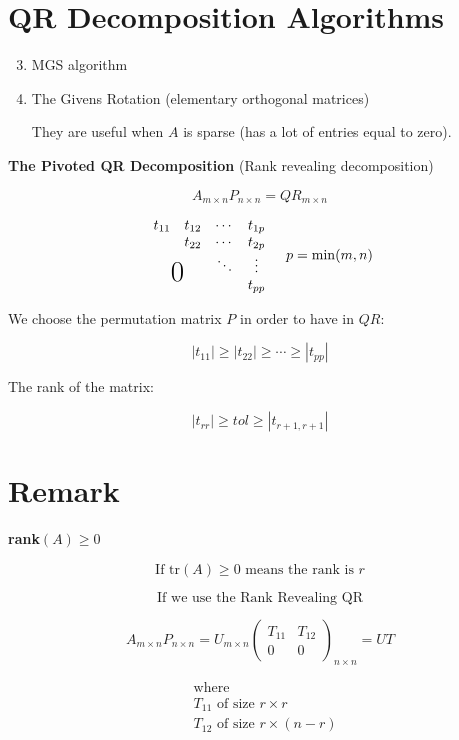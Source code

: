 \section*{QR Decomposition Algorithms}
\begin{enumerate}
    \setcounter{enumi}{2}
    \item MGS algorithm
    \item The Givens Rotation (elementary orthogonal matrices)
    
    They are useful when \( A \) is sparse (has a lot of entries equal to zero).
\end{enumerate}

\textbf{The Pivoted QR Decomposition} (Rank revealing decomposition)

\[
A_{m \times n} P_{n \times n} = QR_{m \times n}
\]

\[
\begin{array}{cccc}
t_{11} & t_{12} & \cdots & t_{1p} \\
 & t_{22} & \cdots & t_{2p} \\
 &  & \ddots & \vdots \\
\multicolumn{2}{c}{\raisebox{1.3ex}[0pt]{\huge0}} &  & t_{pp} \\
\end{array}
\quad p = \min(m, n)
\]

We choose the permutation matrix \( P \) in order to have in \( QR \):

\[
|t_{11}| \geq |t_{22}| \geq \cdots \geq |t_{pp}|
\]

The rank of the matrix:

\[
|t_{rr}| \geq tol \geq |t_{r+1,r+1}|
\]



\section*{Remark}
\textbf{rank}$(A) \geq 0$

\[
\text{If } \text{tr}(A) \geq 0 \text{ means the rank is } r
\]

\[
\text{If we use the Rank Revealing QR}
\]

\[
A_{m \times n} P_{n \times n} = U_{m \times n} \begin{pmatrix}
T_{11} & T_{12} \\
0 & 0
\end{pmatrix}_{n \times n} = U T
\]

\[
\begin{aligned}
&\text{where} \\
&T_{11} \text{ of size } r \times r \\
&T_{12} \text{ of size } r \times (n-r)
\end{aligned}
\]

